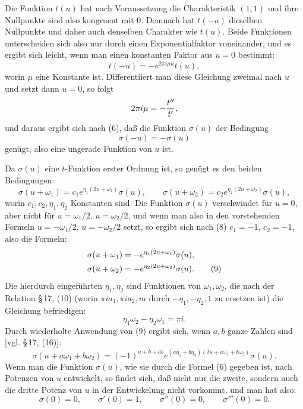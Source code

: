 \documentclass[11pt]{article}
\begin{document}
Die Funktion $t(u)$ hat nach Voraussetzung die Charakteristik $(1,1)$ und ihre Nullpunkte sind also kongruent mit $0$. Demnach hat $t(-u)$ dieselben Nullpunkte und daher auch denselben Charakter wie $t(u)$. Beide Funktionen unterscheiden sich also nur durch einen Exponentialfaktor voneinander, und es ergibt sich leicht, wenn man einen konstanten Faktor aus $u=0$ bestimmt:
\[
t(-u)=-e^{2\pi i\mu u}t(u),
\]
worin $\mu$ eine Konstante ist. Differentiiert man diese Gleichung zweimal nach $u$ und setzt dann $u=0$, so folgt
\[
2\pi i\mu=-{t''\over t'},
\]
und daraus ergibt sich nach (6), daß die Funktion $\sigma(u)$ der Bedingung
\begin{equation}
\sigma(-u)=-\sigma(u) \tag{8}
\end{equation}
genügt, also eine ungerade Funktion von $u$ ist.

Da $\sigma(u)$ eine $t$-Funktion erster Ordnung ist, so genügt es den beiden Bedingungen:
\[
\sigma(u+\omega_1)=c_1e^{\eta_1(2u+\omega_1)}\sigma(u),
\qquad
\sigma(u+\omega_2)=c_2e^{\eta_2(2u+\omega_2)}\sigma(u),
\]
worin $c_1,c_2,\eta_1,\eta_2$ Konstanten sind. Die Funktion $\sigma(u)$ verschwindet für $u=0$, aber nicht für $u=\omega_1/2$, $u=\omega_2/2$, und wenn man also in den vorstehenden Formeln $u=-\omega_1/2$, $u=-\omega_2/2$ setzt, so ergibt sich nach (8) $c_1=-1$, $c_2=-1$, also die Formeln:
\begin{align}
\sigma(u+\omega_1)&=-e^{\eta_1(2u+\omega_1)}\sigma(u),\notag\\
\sigma(u+\omega_2)&=-e^{\eta_2(2u+\omega_2)}\sigma(u). \tag{9}
\end{align}
Die hierdurch eingeführten $\eta_1,\eta_2$ sind Funktionen von $\omega_1,\omega_2$, die nach der Relation \S\,17, (10) (worin $\pi i a_1,\pi i a_2,m$ durch $-\eta_1,-\eta_2,1$ zu ersetzen ist) die Gleichung befriedigen:
\begin{equation}
\eta_1\omega_2-\eta_2\omega_1=\pi i. \tag{10}
\end{equation}
Durch wiederholte Anwendung von (9) ergibt sich, wenn $a,b$ ganze Zahlen sind [vgl. \S\,17, (16)]:
\begin{equation}
\sigma(u+a\omega_1+b\omega_2)
=(-1)^{a+b+ab}e^{(a\eta_1+b\eta_2)(2u+a\omega_1+b\omega_2)}\sigma(u). \tag{11}
\end{equation}
Wenn man die Funktion $\sigma(u)$, wie sie durch die Formel (6) gegeben ist, nach Potenzen von $u$ entwickelt, so findet sich, daß nicht nur die zweite, sondern auch die dritte Potenz von $u$ in der Entwickelung nicht vorkommt, und man hat also:
\begin{equation}
\sigma(0)=0,
\qquad \sigma'(0)=1,
\qquad \sigma''(0)=0,
\qquad \sigma'''(0)=0. \tag{12}
\end{equation}
\end{document}
